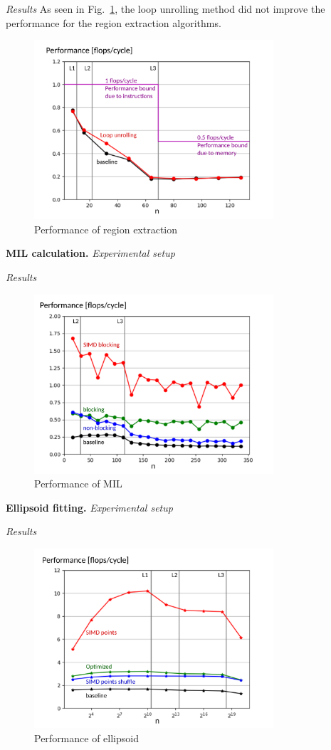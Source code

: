 \documentclass[letterpaper]{article}
\newcommand{\mypar}[1]{{\bf #1.}}
\begin{document}
\textit{Results} As seen in Fig.~\ref{res:regions}, the loop unrolling method did not improve the performance for the region extraction algorithms.
\begin{figure}[H]
  \centering
 
  \includegraphics[width=3.5in]{figs/plots/regions/regions_performance_labelled.png}
  \caption{Performance of region extraction}
  \label{res:regions}
\end{figure}


\mypar{MIL calculation} \textit{Experimental setup}

\textit{Results}

\begin{figure}[H]
  \centering
  \includegraphics[width=3.5in]{figs/plots/mil/mil_performance_labelled.png}
  \caption{Performance of MIL}
  \label{res:mil}
\end{figure}


\mypar{Ellipsoid fitting} \textit{Experimental setup}

\textit{Results}
 
\begin{figure}[H]
  \centering \includegraphics[width=3.5in]{figs/plots/ellipsoid/ellipsoid_performance_labelled.png}
  \caption{Performance of ellipsoid}
  \label{res:ellipsoid}
\end{figure}
\end{document}
